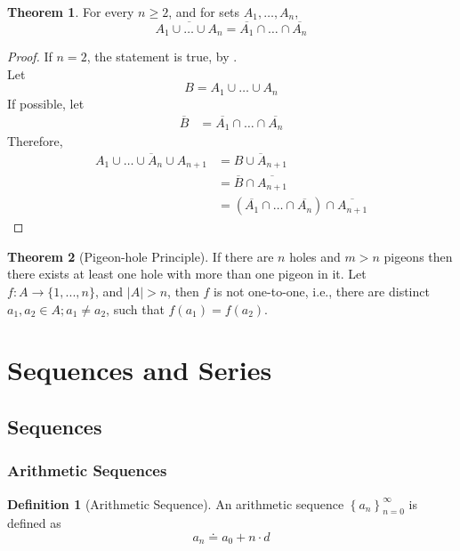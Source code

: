 \documentclass[fleqn, a4paper, 12pt, twoside]{article}
\theoremstyle{definition}
\newtheorem{definition}{Definition}
\theoremstyle{theorem}
\newtheorem{theorem}{Theorem}
\begin{document}
\begin{theorem}
	For every $n \geq 2$, and for sets $A_1, \dots, A_n$,
	\begin{equation*}
		\overline{A_1 \cup \dots \cup A_n} = \overline{A_1} \cap \dots \cap \overline{A_n}
	\end{equation*}
\end{theorem}

\begin{proof}
	If $n = 2$, the statement is true, by .\\
	Let
	\begin{equation*}
		B = A_1 \cup \dots \cup A_n
	\end{equation*}
	If possible, let
	\begin{align*}
		\overline{B} &= \overline{A_1} \cap \dots \cap \overline{A_n}
	\end{align*}
	Therefore,
	\begin{align*}
		\overline{A_1 \cup \dots \cup A_n \cup A_{n + 1}} &= \overline{B \cup A_{n + 1}}\\
		&= \overline{B} \cap \overline{A_{n + 1}}\\
		&= (\overline{A_1} \cap \dots \cap \overline{A_n}) \cap \overline{A_{n + 1}}
	\end{align*}
\end{proof}

\begin{theorem}[Pigeon-hole Principle]
	If there are $n$ holes and $m > n$ pigeons then there exists at least one hole with more than one pigeon in it. Let $f : A \to \{ 1,...,n \}$, and $|A| > n$, then $f$ is not one-to-one, i.e., there are distinct $a_1, a_2 \in A ; a_1 \neq a_2$, such that $f(a_1) = f(a_2)$.
\end{theorem}

\section{Sequences and Series}

\subsection{Sequences}

\subsubsection{Arithmetic Sequences}

\begin{definition}[Arithmetic Sequence]
	An arithmetic sequence $\left\{ a_n \right\}_{n = 0}^{\infty}$ is defined as
	\begin{equation*}
		a_n \doteq a_0 + n \cdot d
	\end{equation*}
\end{definition}
\end{document}
